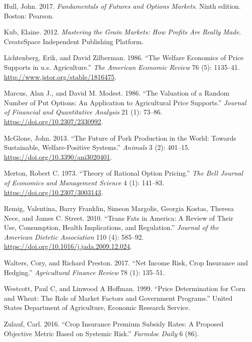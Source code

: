 \documentclass[
  letterpaper,
  DIV=11,
  numbers=noendperiod]{scrreprt}
\newlength{\cslhangindent}
\newenvironment{CSLReferences}[2] %
 {\begin{list}{}{%
  \setlength{\itemindent}{0pt}
  \setlength{\leftmargin}{0pt}
  \setlength{\parsep}{0pt}
  \ifodd #1
   \setlength{\leftmargin}{\cslhangindent}
   \setlength{\itemindent}{-1\cslhangindent}
  \fi
  \setlength{\itemsep}{#2\baselineskip}}}
 {\end{list}}
\begin{document}
\begin{CSLReferences}{1}{0}
Hull, John. 2017. \emph{Fundamentals of Futures and Options Markets}.
Ninth edition. Boston: Pearson.

Kub, Elaine. 2012. \emph{Mastering the Grain Markets: How Profits Are
Really Made}. {CreateSpace} Independent Publishing Platform.

Lichtenberg, Erik, and David Zilberman. 1986. {``The Welfare Economics
of Price Supports in u.s. Agriculture.''} \emph{The American Economic
Review} 76 (5): 1135--41. \url{http://www.jstor.org/stable/1816475}.

Marcus, Alan J., and David M. Modest. 1986. {``The Valuation of a Random
Number of Put Options: An Application to Agricultural Price Supports.''}
\emph{Journal of Financial and Quantitative Analysis} 21 (1): 73--86.
\url{https://doi.org/10.2307/2330992}.

McGlone, John. 2013. {``The Future of Pork Production in the World:
Towards Sustainable, Welfare-Positive Systems.''} \emph{Animals} 3 (2):
401--15. \url{https://doi.org/10.3390/ani3020401}.

Merton, Robert C. 1973. {``Theory of Rational Option Pricing.''}
\emph{The Bell Journal of Economics and Management Science} 4 (1):
141--83. \url{https://doi.org/10.2307/3003143}.

Remig, Valentina, Barry Franklin, Simeon Margolis, Georgia Kostas,
Theresa Nece, and James C. Street. 2010. {``Trans Fats in America: A
Review of Their Use, Consumption, Health Implications, and
Regulation.''} \emph{Journal of the American Dietetic Association} 110
(4): 585--92. \url{https://doi.org/10.1016/j.jada.2009.12.024}.

Walters, Cory, and Richard Preston. 2017. {``Net Income Risk, Crop
Insurance and Hedging.''} \emph{Agricultural Finance Review} 78 (1):
135--51.

Westcott, Paul C, and Linwood A Hoffman. 1999. {``Price Determination
for Corn and Wheat: The Role of Market Factors and Government
Programs.''} United States Department of Agriculture, Economic Research
Service.

Zulauf, Carl. 2016. {``Crop Insurance Premium Subsidy Rates: A Proposed
Objective Metric Based on Systemic Risk.''} \emph{Farmdoc Daily} 6 (86).

\end{CSLReferences}
\end{document}
